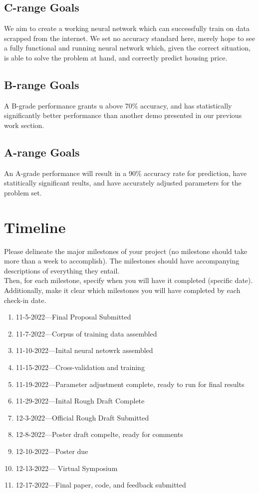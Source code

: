 \documentclass[]{article}
\begin{document}
\subsection{C-range Goals}

We aim to create a working neural network which can successfully train on data scrapped from the internet.  We set no accuracy standard here, merely hope to see a fully functional and running neural network which, given the correct situation, is able to solve the problem at hand, and correctly predict housing price.

\subsection{B-range Goals}

A B-grade performance grants u above 70\% accuracy, and has statistically significantly better performance than another demo presented in our previous work section.

\subsection{A-range Goals}

An A-grade performance will result in a 90\% accuracy rate for prediction, have statitically significant reults, and have accurately adjusted parameters for the problem set.


\section*{Timeline}
Please delineate the major milestones of your project (no milestone should take more than a week to accomplish). The milestones should have accompanying descriptions of everything they entail.\\

Then, for each milestone, specify when you will have it completed (specific date). Additionally, make it clear which milestones you will have completed by each check-in date.
\begin{enumerate}
        \item 11-5-2022---Final Proposal Submitted
        \item 11-7-2022---Corpus of training data assembled
        \item 11-10-2022---Inital neural netowrk assembled
        \item 11-15-2022---Cross-validation and training
        \item 11-19-2022---Parameter adjustment complete, ready to run for final results
        \item 11-29-2022---Inital Rough Draft Complete
        \item 12-3-2022---Official Rough Draft Submitted
        \item 12-8-2022---Poster draft compelte, ready for comments
        \item 12-10-2022---Poster due
        \item 12-13-2022--- Virtual Symposium
        \item 12-17-2022---Final paper, code, and feedback submitted
\end{enumerate}
\end{document}
